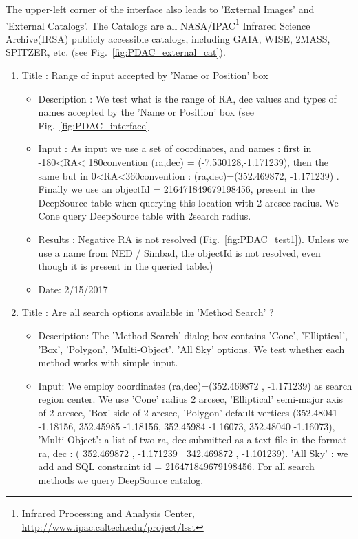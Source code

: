 \documentclass[DM,lsstdraft,toc,usenatbib]{lsstdoc}
\begin{document}
The upper-left corner of the interface also leads to 'External Images' and 'External Catalogs'. The Catalogs are all NASA/IPAC\footnote{Infrared Processing and Analysis Center, \url{http://www.ipac.caltech.edu/project/lsst}}  Infrared Science Archive(IRSA) publicly accessible catalogs, including GAIA, WISE, 2MASS, SPITZER, etc. (see Fig.~\ref{fig:PDAC_external_cat}).


\begin{enumerate}
\item Title : Range of input accepted by 'Name or Position' box  
   \begin{itemize}
       \item Description : We  test what is the range of RA, dec values and types of names accepted by the 'Name or Position' box (see Fig.~\ref{fig:PDAC_interface} 
       \item Input : As input we use a set of coordinates, and names :  first in  -180\degree <RA< 180\degree convention (ra,dec) = (-7.530128\degree,-1.171239\degree), then the  same but in   0\degree<RA<360\degree convention : (ra,dec)=(352.469872\degree , -1.171239\degree) . Finally we use an objectId  = 216471849679198456, present in the DeepSource table when querying this  location with 2 arcsec radius. We Cone query DeepSource table with 2\arcsec search radius.
       \item Results : Negative RA is not resolved (Fig.~\ref{fig:PDAC_test1}). Unless we use a name from NED / Simbad, the objectId  is not resolved, even though it is present in the queried table.)
       \item Date: 2/15/2017
    \end{itemize}
 \item Title : Are all search options available in 'Method Search' ? 
     \begin{itemize}
     	\item Description: The 'Method Search' dialog box contains 'Cone', 'Elliptical', 'Box', 'Polygon', 'Multi-Object', 'All Sky' options. We test whether each method works with simple input. 
     	\item Input:  We employ coordinates (ra,dec)=(352.469872 , -1.171239) as search region center.  We use 'Cone' radius 2 arcsec, 'Elliptical' semi-major axis of 2 arcsec, 'Box' side of 2 arcsec, 'Polygon' default vertices (352.48041 -1.18156, 352.45985 -1.18156, 352.45984 -1.16073, 352.48040 -1.16073), 'Multi-Object': a list  of  two  ra, dec submitted as a text file in the format ra, dec : ( 352.469872 , -1.171239  | 342.469872 , -1.101239).  'All Sky' : we add and SQL constraint  id = 216471849679198456.  For all search methods we query DeepSource catalog. 

\end{itemize}
\end{enumerate}
\end{document}

